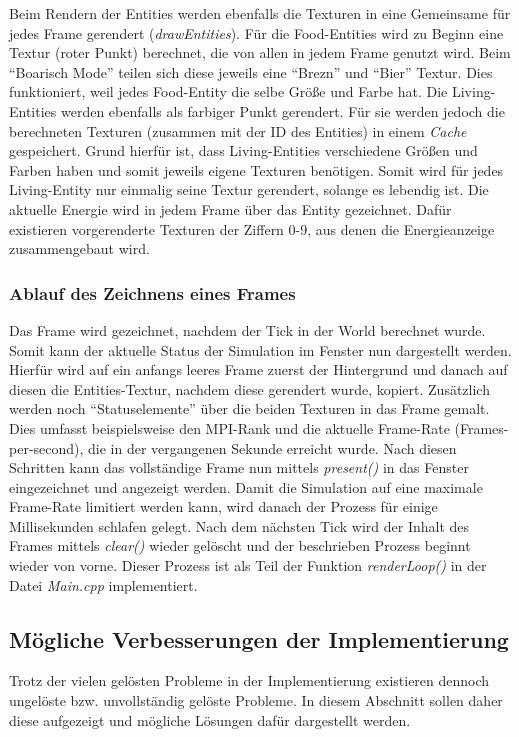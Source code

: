 \documentclass[course=erap]{aspdoc}
\begin{document}
Beim Rendern der Entities werden ebenfalls die Texturen in eine Gemeinsame für jedes Frame gerendert (\emph{drawEntities}). Für die Food-Entities wird zu Beginn eine Textur (roter Punkt) berechnet, die von allen in jedem Frame genutzt wird. Beim "`Boarisch Mode"' teilen sich diese jeweils eine "`Brezn"' und "`Bier"' Textur. Dies funktioniert, weil jedes Food-Entity die selbe Größe und Farbe hat. Die Living-Entities werden ebenfalls als farbiger Punkt gerendert. Für sie werden jedoch die berechneten Texturen (zusammen mit der ID des Entities) in einem \emph{Cache} gespeichert. Grund hierfür ist, dass Living-Entities verschiedene Größen und Farben haben und somit jeweils eigene Texturen benötigen. Somit wird für jedes Living-Entity nur einmalig seine Textur gerendert, solange es lebendig ist. Die aktuelle Energie wird in jedem Frame über das Entity gezeichnet. Dafür existieren vorgerenderte Texturen der Ziffern 0-9, aus denen die Energieanzeige zusammengebaut wird.


\subsubsection{Ablauf des Zeichnens eines Frames}
Das Frame wird gezeichnet, nachdem der Tick in der World berechnet wurde. Somit kann der aktuelle Status der Simulation im Fenster nun dargestellt werden. Hierfür wird auf ein anfangs leeres Frame zuerst der Hintergrund und danach auf diesen die Entities-Textur, nachdem diese gerendert wurde, kopiert. Zusätzlich werden noch "`Statuselemente"' über die beiden Texturen in das Frame gemalt. Dies umfasst beispielsweise den MPI-Rank und die aktuelle Frame-Rate (Frames-per-second), die in der vergangenen Sekunde erreicht wurde. Nach diesen Schritten kann das vollständige Frame nun mittels \emph{present()} in das Fenster eingezeichnet und angezeigt werden. Damit die Simulation auf eine maximale Frame-Rate limitiert werden kann, wird danach der Prozess für einige Millisekunden schlafen gelegt. Nach dem nächsten Tick wird der Inhalt des Frames mittels \emph{clear()} wieder gelöscht und der beschrieben Prozess beginnt wieder von vorne. Dieser Prozess ist als Teil der Funktion \emph{renderLoop()} in der Datei \emph{Main.cpp} implementiert.


\subsection{Mögliche Verbesserungen der Implementierung}
Trotz der vielen gelösten Probleme in der Implementierung existieren dennoch ungelöste bzw. unvollständig gelöste Probleme. In diesem Abschnitt sollen daher diese aufgezeigt und mögliche Lösungen dafür dargestellt werden.
\end{document}
